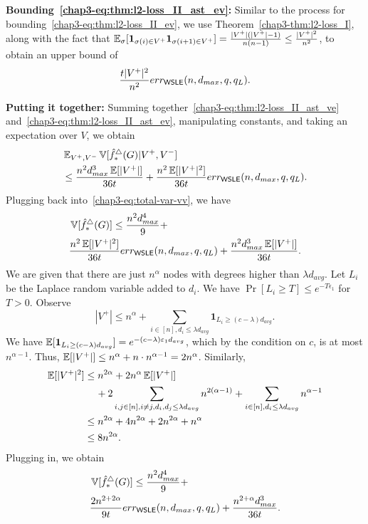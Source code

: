 \noindent\textbf{Bounding~\eqref{chap3-eq:thm:l2-loss_II_ast_ev}:}
Similar to the process for bounding~\eqref{chap3-eq:thm:l2-loss_II_ev}, we use
Theorem~\ref{chap3-thm:l2-loss_I}, along with the fact that
$\operatorname{\mathbb{E}}_\sigma[\textbf{1}_{\sigma(i) \in V^+} \textbf{1}_{\sigma(i+1) \in V^+}] =
\frac{|V^+|(|V^+|-1)}{n(n-1)} \leq \frac{|V^+|^2}{n^2}$, to obtain an upper bound of
\[
\frac{t|V^+|^2}{n^2} err_{\textsf{WSLE}}(n,d_{max},q,q_L).
\]

\noindent\textbf{Putting it together:}
Summing together~\eqref{chap3-eq:thm:l2-loss_II_ast_ve}
and~\eqref{chap3-eq:thm:l2-loss_II_ast_ev},
manipulating constants, and taking an expectation over $V$, we obtain
\begin{align*}
  &\operatorname{\mathbb{E}}_{V^+,V^-}\operatorname{\mathbb{V}}[\hat{f}_*^\triangle(G)|V^+,V^-] \\
  &\leq \frac{n^2 d_{max}^3 \operatorname{\mathbb{E}}[|V^+|]}{36t} +
  \frac{n^2\operatorname{\mathbb{E}}[|V^+|^2]}{36t}err_{\textsf{WSLE}}(n, d_{max}, q, q_L).
\end{align*}
Plugging back into~\eqref{chap3-eq:total-var-vv}, we have
\begin{align*}
  &\operatorname{\mathbb{V}}[\hat{f}_*^\triangle(G)] \leq \frac{n^2 d_{max}^4}{9} + \\
  &\frac{n^2\operatorname{\mathbb{E}}[|V^+|^2]}{36t}err_{\textsf{WSLE}}(n,d_{max},q,q_L) + \frac{n^2
  d_{max}^3 \operatorname{\mathbb{E}}[|V^+|]}{36t}.
\end{align*}
We are given that there are just $n^\alpha$ nodes with degrees higher than $\lambda
d_{avg}$. 
Let $L_i$ be the Laplace random variable added to $d_i$.
We have $\Pr[L_i \geq T] \leq e^{-T \epsilon_1}$ for $T > 0$.
Observe
\[
  |V^+| \leq n^\alpha + \sum_{i \in [n], d_i \leq \lambda d_{avg}}
  \textbf{1}_{L_i \geq (c-\lambda) d_{avg}}.
\]
We have $\operatorname{\mathbb{E}}[\textbf{1}_{L_i \geq (c-\lambda) d_{avg}}] =
e^{-(c-\lambda)\varepsilon_1 d_{avg}}$, which by the condition on $c$, is at most
$n^{\alpha-1}$. Thus, 
$\operatorname{\mathbb{E}}[|V^+|] \leq n^{\alpha} + n \cdot  n^{\alpha-1} = 2 n^{\alpha}$. 
Similarly, 
\begin{align*}
  \operatorname{\mathbb{E}}[|V^+|^2] &\leq n^{2\alpha} + 2n^{\alpha} \operatorname{\mathbb{E}}[|V^+|] \\& \hspace{4mm}+2\sum_{i,j \in [n], i \ne j, d_i,d_j \leq \lambda d_{avg}} n^{2(\alpha-1)} + \sum_{i \in [n], d_i \leq
  \lambda d_{avg}} n^{\alpha-1} \\
  &\leq n^{2\alpha} + 4n^{2\alpha} + 2n^{2\alpha} + n^\alpha \\
  &\leq 8n^{2\alpha}.
\end{align*}
Plugging in, we obtain
\begin{align*}
  &\operatorname{\mathbb{V}}[\hat{f}_*^\triangle(G)] \leq \frac{n^2 d_{max}^4}{9} + \\
  &\frac{2n^{2+2\alpha}}{9t}err_{\textsf{WSLE}}(n,d_{max},q,q_L) + \frac{n^{2+\alpha}
  d_{max}^3 }{36t}.
\end{align*}


